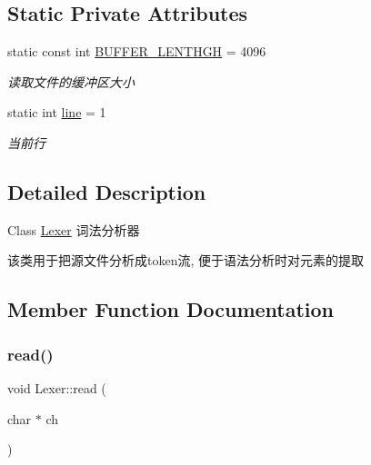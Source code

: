 \subsection*{Static Private Attributes}
\begin{DoxyCompactItemize}
\item 
\mbox{\label{class_lexer_af8222e02dc3180feb942b4a6d3083a22}} 
static const int \hyperlink{class_lexer_af8222e02dc3180feb942b4a6d3083a22}{B\+U\+F\+F\+E\+R\+\_\+\+L\+E\+N\+T\+H\+GH} = 4096
\begin{DoxyCompactList}\small\item\em 读取文件的缓冲区大小 \end{DoxyCompactList}\item 
\mbox{\label{class_lexer_a35d0802ee5cced4c5294fb6dc77ad2f4}} 
static int \hyperlink{class_lexer_a35d0802ee5cced4c5294fb6dc77ad2f4}{line} = 1
\begin{DoxyCompactList}\small\item\em 当前行 \end{DoxyCompactList}\end{DoxyCompactItemize}


\subsection{Detailed Description}
Class \hyperlink{class_lexer}{Lexer} 词法分析器 

该类用于把源文件分析成token流, 便于语法分析时对元素的提取 

\subsection{Member Function Documentation}
\mbox{\label{class_lexer_abb0f5b7f1e6fd685c8c8e9074553c67f}} 
\subsubsection{\texorpdfstring{read()}{read()}}
{\footnotesize\ttfamily void Lexer\+::read (\begin{DoxyParamCaption}\item[{char $\ast$}]{ch }\end{DoxyParamCaption})\hspace{0.3cm}{\ttfamily [private]}}

